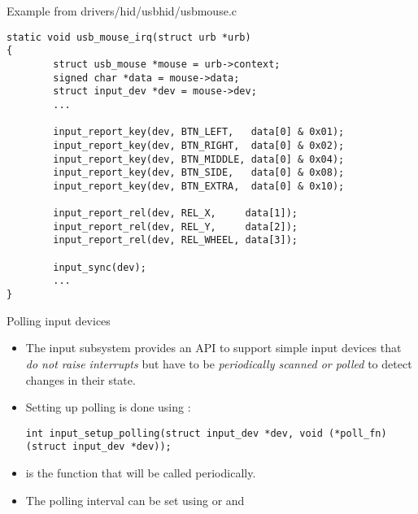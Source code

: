 \begin{frame}[fragile]{Example from drivers/hid/usbhid/usbmouse.c}
  \begin{block}{}
  \begin{verbatim}
static void usb_mouse_irq(struct urb *urb)
{
        struct usb_mouse *mouse = urb->context;
        signed char *data = mouse->data;
        struct input_dev *dev = mouse->dev;
        ...

        input_report_key(dev, BTN_LEFT,   data[0] & 0x01);
        input_report_key(dev, BTN_RIGHT,  data[0] & 0x02);
        input_report_key(dev, BTN_MIDDLE, data[0] & 0x04);
        input_report_key(dev, BTN_SIDE,   data[0] & 0x08);
        input_report_key(dev, BTN_EXTRA,  data[0] & 0x10);

        input_report_rel(dev, REL_X,     data[1]);
        input_report_rel(dev, REL_Y,     data[2]);
        input_report_rel(dev, REL_WHEEL, data[3]);

        input_sync(dev);
        ...
}
  \end{verbatim}
  \end{block}
\end{frame}

\begin{frame}[fragile]{Polling input devices}
  \begin{itemize}
  \item The input subsystem provides an API to support simple input
    devices that {\em do not raise interrupts} but have to be {\em
      periodically scanned or polled} to detect changes in their
    state.
  \item Setting up polling is done using :
  \begin{verbatim}
int input_setup_polling(struct input_dev *dev, void (*poll_fn)(struct input_dev *dev));
  \end{verbatim}
  \item {} is the function that will be called
    periodically.
  \item The polling interval can be set using
     or
     and
  \end{itemize}
\end{frame}

